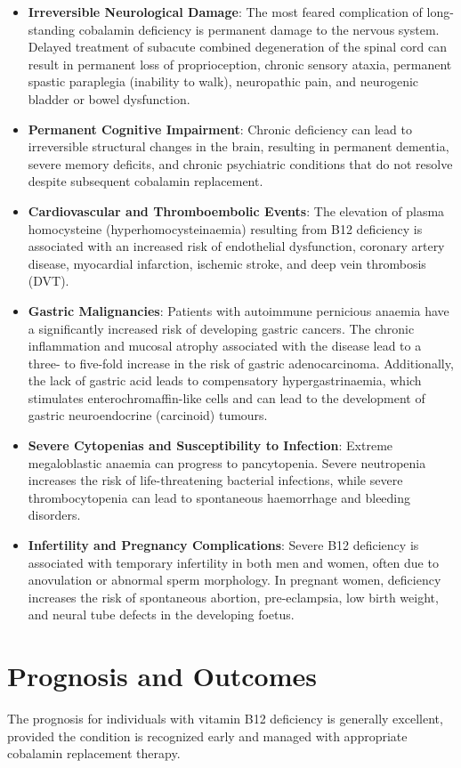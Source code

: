 \begin{itemize}
    \item \textbf{Irreversible Neurological Damage}: The most feared complication of long-standing cobalamin deficiency is permanent damage to the nervous system. Delayed treatment of subacute combined degeneration of the spinal cord can result in permanent loss of proprioception, chronic sensory ataxia, permanent spastic paraplegia (inability to walk), neuropathic pain, and neurogenic bladder or bowel dysfunction.
    \item \textbf{Permanent Cognitive Impairment}: Chronic deficiency can lead to irreversible structural changes in the brain, resulting in permanent dementia, severe memory deficits, and chronic psychiatric conditions that do not resolve despite subsequent cobalamin replacement.
    \item \textbf{Cardiovascular and Thromboembolic Events}: The elevation of plasma homocysteine (hyperhomocysteinaemia) resulting from B12 deficiency is associated with an increased risk of endothelial dysfunction, coronary artery disease, myocardial infarction, ischemic stroke, and deep vein thrombosis (DVT).
    \item \textbf{Gastric Malignancies}: Patients with autoimmune pernicious anaemia have a significantly increased risk of developing gastric cancers. The chronic inflammation and mucosal atrophy associated with the disease lead to a three- to five-fold increase in the risk of gastric adenocarcinoma. Additionally, the lack of gastric acid leads to compensatory hypergastrinaemia, which stimulates enterochromaffin-like cells and can lead to the development of gastric neuroendocrine (carcinoid) tumours.
    \item \textbf{Severe Cytopenias and Susceptibility to Infection}: Extreme megaloblastic anaemia can progress to pancytopenia. Severe neutropenia increases the risk of life-threatening bacterial infections, while severe thrombocytopenia can lead to spontaneous haemorrhage and bleeding disorders.
    \item \textbf{Infertility and Pregnancy Complications}: Severe B12 deficiency is associated with temporary infertility in both men and women, often due to anovulation or abnormal sperm morphology. In pregnant women, deficiency increases the risk of spontaneous abortion, pre-eclampsia, low birth weight, and neural tube defects in the developing foetus.
\end{itemize}

\section*{Prognosis and Outcomes}
The prognosis for individuals with vitamin B12 deficiency is generally excellent, provided the condition is recognized early and managed with appropriate cobalamin replacement therapy.

